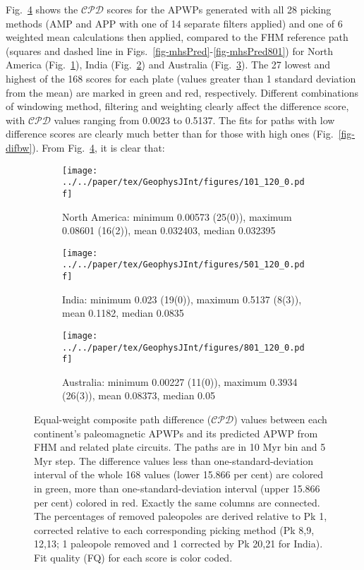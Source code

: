 Fig.~\ref{fig-dif} shows the $\mathcal{CPD}$ scores for the APWPs generated with
all 28 picking methods (AMP and APP with one of 14 separate filters applied) and
one of 6 weighted mean calculations then applied, compared to the FHM reference
path (squares and dashed line in Figs.~\ref{fig-mhsPred}-\ref{fig-mhsPred801})
for North America (Fig.~\ref{fig-na-dif}), India (Fig.~\ref{fig-in-dif}) and
Australia (Fig.~\ref{fig-au-dif}). The 27 lowest and highest of the 168
scores for each plate (values greater than 1 standard deviation from the mean)
are marked in green and red, respectively. Different combinations of windowing
method, filtering and weighting clearly affect the difference score, with
$\mathcal{CPD}$ values ranging from 0.0023 to 0.5137. The fits for paths with
low difference scores are clearly much better than for those with high ones
(Fig.~\ref{fig-difbw}). From Fig.~\ref{fig-dif}, it is clear that:

\begin{figure}
  \vspace*{-1.1cm}
	\centering
	\begin{subfigure}{.94\textwidth}
		\texttt{[image: ../../paper/tex/GeophysJInt/figures/101\_120\_0.pdf]}
		\caption{North America: minimum 0.00573 (25(0)), maximum
		0.08601 (16(2)), mean 0.032403, median 0.032395}\label{fig-na-dif} %
	\end{subfigure}
	\vspace{.1em} %
	\begin{subfigure}{.94\textwidth}
		\texttt{[image: ../../paper/tex/GeophysJInt/figures/501\_120\_0.pdf]}
		\caption{India: minimum 0.023 (19(0)), maximum 0.5137 (8(3)),
		mean 0.1182, median 0.0835}\label{fig-in-dif} %
	\end{subfigure}
	\vspace{.1em}
	\begin{subfigure}{.94\textwidth}
		\texttt{[image: ../../paper/tex/GeophysJInt/figures/801\_120\_0.pdf]}
		\caption{Australia: minimum 0.00227 (11(0)), maximum
		0.3934 (26(3)), mean 0.08373, median 0.05}\label{fig-au-dif} %
	\end{subfigure}
	\caption[$\mathcal{CPD}$ of each plate's paleomagnetic APWPs vs its FHM
predicted APWP]{Equal-weight composite path difference ($\mathcal{CPD}$) values
between each continent's paleomagnetic APWPs and its predicted APWP from FHM and
related plate circuits. The paths are in 10 Myr bin and 5 Myr step. The
difference values less than one-standard-deviation interval of the whole 168
values (lower 15.866 per cent) are colored in green, more than
one-standard-deviation interval (upper 15.866 per cent) colored in red. Exactly
the same columns are connected. The percentages of removed paleopoles are
derived relative to Pk 1, corrected relative to each corresponding picking
method (Pk 8,9, 12,13; 1 paleopole removed and 1 corrected by Pk 20,21 for
India). Fit quality (FQ) for each score is color coded.}\label{fig-dif} %
\end{figure}

